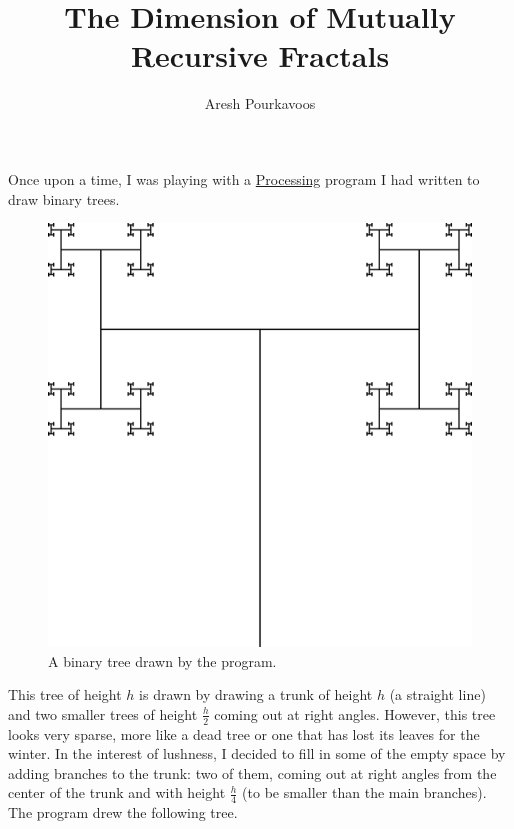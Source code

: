 \documentclass{article}
\begin{document}
\title{The Dimension of Mutually Recursive Fractals}
\author{Aresh Pourkavoos}
\maketitle

Once upon a time, I was playing with a
\href{https://processing.org}{Processing}
program I had written to draw binary trees.
\begin{figure}[H]
  \centering
  \includegraphics[scale=0.125]{binary_tree.png}
  \caption*{A binary tree drawn by the program.}
\end{figure}
This tree of height $h$ is drawn by drawing
a trunk of height $h$ (a straight line)
and two smaller trees of height $\frac{h}{2}$
coming out at right angles.
However, this tree looks very sparse,
more like a dead tree or one that has lost its leaves for the winter.
In the interest of lushness, I decided to fill in some of the empty space
by adding branches to the trunk:
two of them, coming out at right angles from the center of the trunk
and with height $\frac{h}{4}$ (to be smaller than the main branches).
The program drew the following tree.
\end{document}
